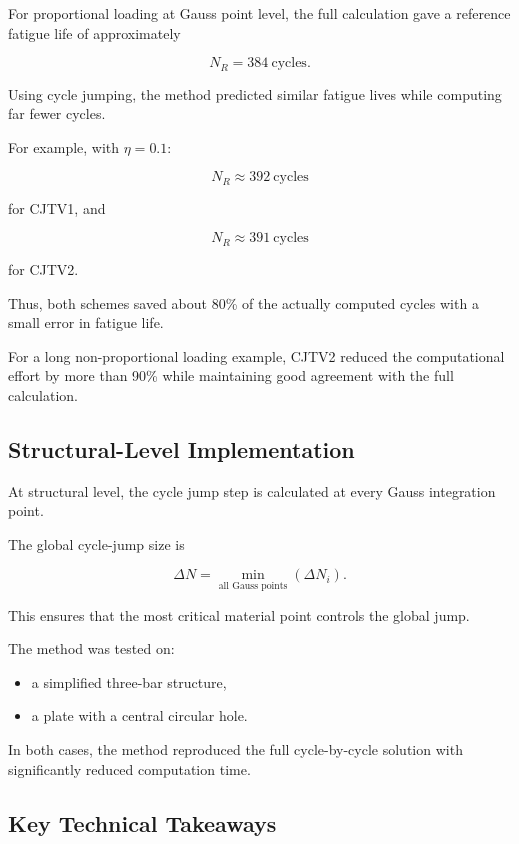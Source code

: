 ﻿\documentclass[11pt,a4paper]{article}
\begin{document}
For proportional loading at Gauss point level, the full calculation gave a reference fatigue life of approximately

\[
N_R = 384 \ \text{cycles}.
\]

Using cycle jumping, the method predicted similar fatigue lives while computing far fewer cycles.

For example, with $\eta=0.1$:

\[
N_R \approx 392 \ \text{cycles}
\]

for CJTV1, and

\[
N_R \approx 391 \ \text{cycles}
\]

for CJTV2.

Thus, both schemes saved about 80\% of the actually computed cycles with a small error in fatigue life.

For a long non-proportional loading example, CJTV2 reduced the computational effort by more than 90\% while maintaining good agreement with the full calculation.

\subsection{Structural-Level Implementation}

At structural level, the cycle jump step is calculated at every Gauss integration point.

The global cycle-jump size is

\[
\Delta N
=
\min_{\text{all Gauss points}}
\left(
\Delta N_i
\right).
\]

This ensures that the most critical material point controls the global jump.

The method was tested on:

\begin{itemize}[leftmargin=*]
    \item a simplified three-bar structure,
    \item a plate with a central circular hole.
\end{itemize}

In both cases, the method reproduced the full cycle-by-cycle solution with significantly reduced computation time.

\subsection{Key Technical Takeaways}
\end{document}
